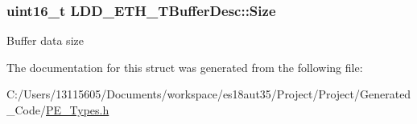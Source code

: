 \subsubsection[{Size}]{\setlength{\rightskip}{0pt plus 5cm}uint16\+\_\+t L\+D\+D\+\_\+\+E\+T\+H\+\_\+\+T\+Buffer\+Desc\+::\+Size}\label{struct_l_d_d___e_t_h___t_buffer_desc_abddc4273b732d3cf44ff0b6870d6b87a}
Buffer data size 

The documentation for this struct was generated from the following file\+:\begin{DoxyCompactItemize}
\item 
C\+:/\+Users/13115605/\+Documents/workspace/es18aut35/\+Project/\+Project/\+Generated\+\_\+\+Code/\hyperlink{_p_e___types_8h}{P\+E\+\_\+\+Types.\+h}\end{DoxyCompactItemize}
